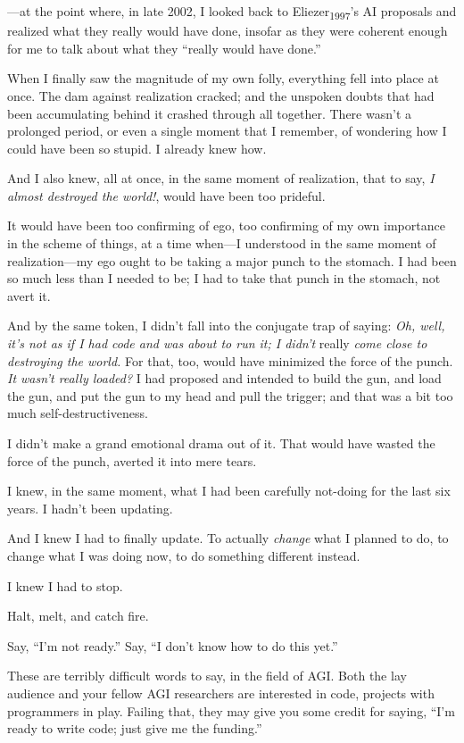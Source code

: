 {
 {}---at the point where, in late 2002, I looked back to
Eliezer\textsubscript{1997}'s AI proposals and realized
what they really would have done, insofar as they were coherent enough
for me to talk about what they ``really would have
done.''}

{
 When I finally saw the magnitude of my own folly, everything fell
into place at once. The dam against realization cracked; and the
unspoken doubts that had been accumulating behind it crashed through
all together. There wasn't a prolonged period, or even
a single moment that I remember, of wondering how I could have been so
stupid. I already knew how.}

{
 And I also knew, all at once, in the same moment of realization,
that to say, \textit{I almost destroyed the world!}, would have been
too prideful.}

{
 It would have been too confirming of ego, too confirming of my own
importance in the scheme of things, at a time when---I understood in
the same moment of realization---my ego ought to be taking a major
punch to the stomach. I had been so much less than I needed to be; I
had to take that punch in the stomach, not avert it.}

{
 And by the same token, I didn't fall into the
conjugate trap of saying: \textit{Oh, well, it's not as
if I had code and was about to run it; I didn't} really
\textit{come close to destroying the world.} For that, too, would have
minimized the force of the punch. \textit{It wasn't
really loaded?} I had proposed and intended to build the gun, and load
the gun, and put the gun to my head and pull the trigger; and that was
a bit too much self-destructiveness.}

{
 I didn't make a grand emotional drama out of it.
That would have wasted the force of the punch, averted it into mere
tears.}

{
 I knew, in the same moment, what I had been carefully not-doing
for the last six years. I hadn't been updating.}

{
 And I knew I had to finally update. To actually \textit{change}
what I planned to do, to change what I was doing now, to do something
different instead.}

{
 I knew I had to stop.}

{
 Halt, melt, and catch fire.}

{
 Say, ``I'm not
ready.'' Say, ``I
don't know how to do this yet.''}

{
 These are terribly difficult words to say, in the field of AGI.
Both the lay audience and your fellow AGI researchers are interested in
code, projects with programmers in play. Failing that, they may give
you some credit for saying, ``I'm
ready to write code; just give me the funding.''}

